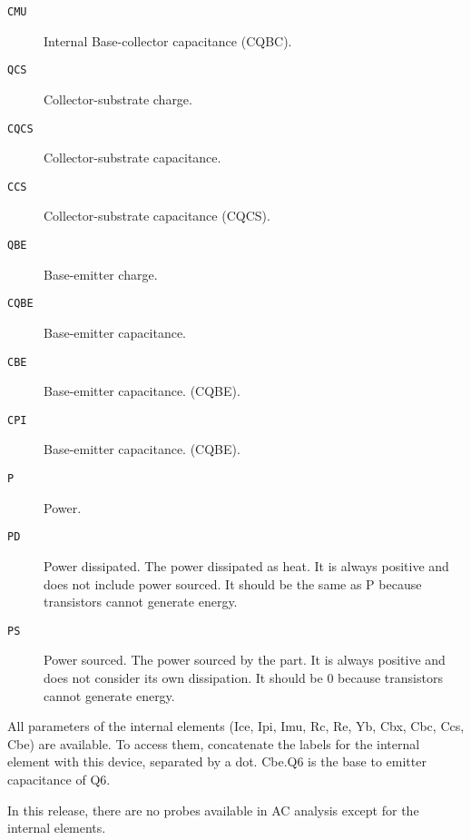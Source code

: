\begin{description}
\item[{\tt CMU}] Internal Base-collector capacitance (CQBC).

\item[{\tt QCS}] Collector-substrate charge.

\item[{\tt CQCS}] Collector-substrate capacitance.

\item[{\tt CCS}] Collector-substrate capacitance (CQCS).

\item[{\tt QBE}] Base-emitter charge.

\item[{\tt CQBE}] Base-emitter capacitance.

\item[{\tt CBE}] Base-emitter capacitance. (CQBE).

\item[{\tt CPI}] Base-emitter capacitance. (CQBE).

\item[{\tt P}] Power.

\item[{\tt PD}]
Power dissipated.  The power dissipated as heat.  It is always
positive and does not include power sourced.  It should be the same as
P because transistors cannot generate energy.

\item[{\tt PS}]
Power sourced.  The power sourced by the part.  It is always positive
and does not consider its own dissipation.  It should be 0 because
transistors cannot generate energy.

\end{description}

All parameters of the internal elements (Ice, Ipi, Imu, Rc, Re, Yb,
Cbx, Cbc, Ccs, Cbe) are available.  To access them, concatenate the
labels for the internal element with this device, separated by a dot.
Cbe.Q6 is the base to emitter capacitance of Q6.

In this release, there are no probes available in AC analysis except
for the internal elements.
